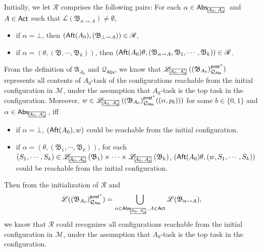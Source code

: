 \documentclass[preprint,12pt]{elsarticle}
\makeatletter
\newcommand\mathcircled[1]{%
  \mathpalette\@mathcircled{#1}%
}
\newcommand\@mathcircled[2]{%
  \tikz[baseline=(math.base)] \node[draw,circle,inner sep=0.2pt] (math) {$\m@th#1#2$};%
}
\newcommand\rectangled[1]{\tikz[baseline=(torect.base)]{
    \node[shape = rectangle, draw, inner sep=0pt, outer sep = 0pt] (torect) {#1}
    }
}
\newcommand{\mrectangled}[1]{\text{\rectangled{\ensuremath{#1}}}}
\newcommand{\mhcancel}[1]{\mrectangled{#1}}
\newcommand\Mm{{\mathcal{M} }}
\newcommand\Qq{{\mathcal{Q} }}
\newcommand\act{{\sf Act}}
\newcommand\aft{{\sf Aft}}
\newcommand\post{{\mathsf{post} }}
\newcommand\abs{{\mathsf{Abs} }}
\newcommand\AutReach{\mathscr{R}}
\newcommand\Aut{{\mathfrak{A} }}
\newcommand\AutB{{\mathfrak{B} }}
\newcommand\Lang{{\mathscr{L} }}
\makeatother
\begin{document}
{%
Initially, we let $\AutReach$ comprises the following pairs:
For each $\alpha\in\abs_{\mhcancel{A_0,A_0'}}$ and $A\in\act$ such that $\Lang(\AutB_{\alpha\rightsquigarrow A})\neq \emptyset$,
\begin{itemize}
    \item if $\alpha = \bot$, then $(\aft(A_0), (\AutB_{\bot\rightsquigarrow A}))\in\AutReach$,
    \item if $\alpha = (\theta,(\AutB,\cdots,\AutB_k))$, then $(\aft(A_0)\theta, (\AutB_{\alpha\rightsquigarrow A}, \AutB_1, \cdots, \AutB_k))\in\AutReach$.
\end{itemize}
From the definition of $\Aut_{A_0}$ and $\Qq_{\abs}$, we know that $\Lang_{\mhcancel{A_0,A_0'}}((\AutB_{A_0})^{\post^*}_{\Qq_{\abs}})$ represents all contents of $A_0$-task of the configurations reachable from the initial configuration in $\Mm$, under the assumption that $A_0$-task is the top task in the configuration. Moreover, $w\in\Lang_{\mhcancel{A_0,A_0'}}((\AutB_{A_0})^{\post^*}_{\Qq_{\abs}}((\alpha,p_b)))$ for some $b\in\{0,1\}$ and $\alpha \in \abs_{\mhcancel{A_0,A_0'}}$, iff
\begin{itemize}
    \item if $\alpha = \bot$, $(\aft(A_0), w)$ could be reachable from the initial configuration.
    \item if $\alpha = (\theta, (\AutB_1, \cdots, \AutB_k))$, for each $(S_1, \cdots, S_k) \in \Lang_{\mhcancel{A_0,A_0'}}(\AutB_1) \times \cdots \times \Lang_{\mhcancel{A_0,A_0'}}(\AutB_k)$, $(\aft(A_0)\theta, (w, S_1, \cdots, S_k))$ could be reachable from the initial configuration.
\end{itemize}
Then from the initialization of $\AutReach$ and
$$\Lang((\AutB_{A_0})^{\post^*}_{\Qq_{\abs}}) = \bigcup\limits_{\alpha\in\abs_{\mhcancel{A_0,A_0'}}, A\in\act}\Lang(\AutB_{\alpha\rightsquigarrow A}),$$
we know that $\AutReach$ could recognizes all configurations reachable from the initial configuration in $\Mm$, under the assumption that $A_0$-task is the top task in the configuration.

}
\end{document}
